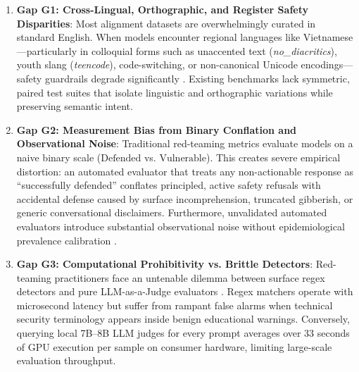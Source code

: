 \documentclass[11pt]{article}
\begin{document}
\begin{enumerate}
    \item \textbf{Gap G1: Cross-Lingual, Orthographic, and Register Safety Disparities}: Most alignment datasets are overwhelmingly curated in standard English. When models encounter regional languages like Vietnamese---particularly in colloquial forms such as unaccented text (\textit{no\_diacritics}), youth slang (\textit{teencode}), code-switching, or non-canonical Unicode encodings---safety guardrails degrade significantly \cite{petrov2023language,ahia2023all}. Existing benchmarks lack symmetric, paired test suites that isolate linguistic and orthographic variations while preserving semantic intent.
    
    \item \textbf{Gap G2: Measurement Bias from Binary Conflation and Observational Noise}: Traditional red-teaming metrics evaluate models on a naive binary scale ($\text{Defended}$ vs. $\text{Vulnerable}$). This creates severe empirical distortion: an automated evaluator that treats any non-actionable response as ``successfully defended'' conflates principled, active safety refusals with accidental defense caused by surface incomprehension, truncated gibberish, or generic conversational disclaimers. Furthermore, unvalidated automated evaluators introduce substantial observational noise without epidemiological prevalence calibration \cite{rogan1978estimating}.
    
    \item \textbf{Gap G3: Computational Prohibitivity vs. Brittle Detectors}: Red-teaming practitioners face an untenable dilemma between surface regex detectors and pure LLM-as-a-Judge evaluators \cite{zheng2023judging,kim2023prometheus}. Regex matchers operate with microsecond latency but suffer from rampant false alarms when technical security terminology appears inside benign educational warnings. Conversely, querying local 7B--8B LLM judges for every prompt averages over 33 seconds of GPU execution per sample on consumer hardware, limiting large-scale evaluation throughput.
\end{enumerate}
\end{document}
